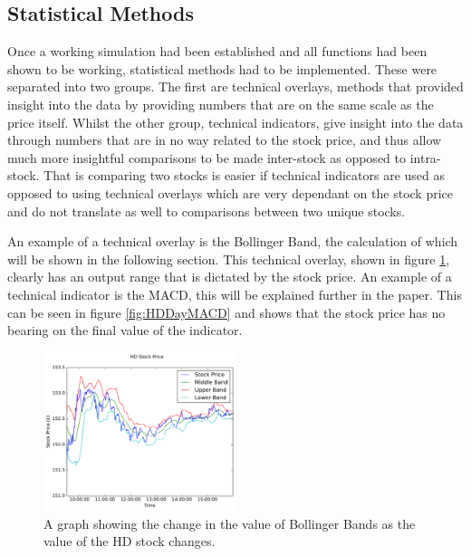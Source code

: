 \documentclass[conference]{IEEEtran}
\begin{document}

\subsection{Statistical Methods}

Once a working simulation had been established and all functions had been shown to be working, statistical methods had to be implemented. These were separated into two groups. The first are technical overlays, methods that provided insight into the data by providing numbers that are on the same scale as the price itself. Whilst the other group, technical indicators, give insight into the data through numbers that are in no way related to the stock price, and thus allow much more insightful comparisons to be made inter-stock as opposed to intra-stock. That is comparing two stocks is easier if technical indicators are used as opposed to using technical overlays which are very dependant on the stock price and do not translate as well to comparisons between two unique stocks. 

An example of a technical overlay is the Bollinger Band, the calculation of which will be shown in the following section. This technical overlay, shown in figure \ref{fig:HDDayBollinger}, clearly has an output range that is dictated by the stock price. An example of a technical indicator is the MACD, this will be explained further in the paper. This can be seen in figure \ref{fig:HDDayMACD} and shows that the stock price has no bearing on the final value of the indicator.

\begin{figure}
\includegraphics[width=0.5\textwidth, angle=0]{HDDayBollinger.pdf}
\caption{A graph showing the change in the value of Bollinger Bands as the value of the HD stock changes.}
\label{fig:HDDayBollinger}
\end{figure}
\end{document}
